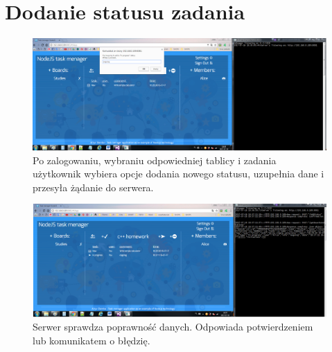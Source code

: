 \documentclass[12pt]{report}
\begin{document}
\section{Dodanie statusu zadania}
\begin{figure}[!hb]
\centering
\includegraphics[width=\textwidth,height=\textheight,keepaspectratio]{B1.png}
\captionsetup{labelformat=empty}
\caption[]{Po zalogowaniu, wybraniu odpowiedniej tablicy i zadania użytkownik wybiera opcje dodania nowego statusu, uzupełnia dane i przesyła żądanie do serwera.}
\end{figure}
\begin{figure}[!hb]
\centering
\includegraphics[width=\textwidth,height=\textheight,keepaspectratio]{B2.png}
\captionsetup{labelformat=empty}
\caption[]{Serwer sprawdza poprawność danych. Odpowiada potwierdzeniem lub komunikatem o błędzię.}
\end{figure}
\end{document}
